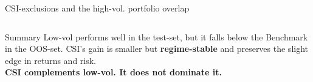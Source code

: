 \documentclass[10pt]{beamer}\usepackage[]{graphicx}\usepackage[table]{xcolor}
\begin{document}
\begin{frame}{CSI-exclusions and the high-vol. portfolio overlap}
\begin{columns}[T,onlytextwidth]
  \end{columns}
  
\begin{alertblock}{Summary}
        \scriptsize
        Low-vol performs well in the test-set, but it falls below the Benchmark in the OOS-set. CSI's gain is smaller but \textbf{regime-stable} and preserves the slight edge in returns and risk.\\[1.5mm]
        {\color{MainColour}\small\textbf{CSI complements low-vol. It does not dominate it.}}
      \end{alertblock}
  \end{frame}
\end{document}
